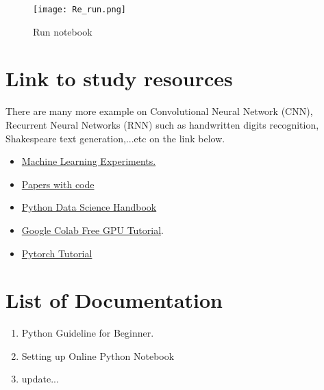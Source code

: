 \documentclass[a4paper,10pt]{article}
\begin{document}
\begin{figure}[H]
\centering\texttt{[image: Re\_run.png]}
\caption[Short title]{Run notebook}
\label{fig:ff7}\end{figure}


\section{Link to study resources}
There are many more example on Convolutional Neural Network (CNN), Recurrent Neural Networks (RNN) such as handwritten digits recognition, Shakespeare text generation,...etc on the link below.

\begin{itemize}
  \item \href{https://github.com/trekhleb/machine-learning-experiments}{Machine Learning Experiments.}
  \item \href{https://paperswithcode.com/}{Papers with code}
  \item \href{https://github.com/jakevdp/PythonDataScienceHandbook}{Python Data Science Handbook}
  \item \href{https://medium.com/deep-learning-turkey/google-colab-free-gpu-tutorial-e113627b9f5d}{Google Colab Free GPU Tutorial}.
  \item \href{https://pytorch.org/tutorials/beginner/nn_tutorial.html}{Pytorch Tutorial}

\end{itemize}




\section{List of Documentation}

\begin{enumerate}
  \item Python Guideline for Beginner.
  \item Setting up Online Python Notebook
  \item update...
\end{enumerate}

\vspace{1cm}
\vspace{1cm}
\end{document}
